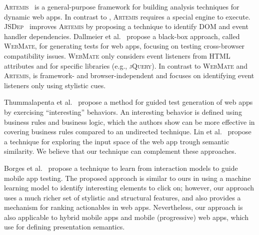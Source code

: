 \textsc{Artemis}~\cite{artzi2011framework} is a general-purpose
framework for building analysis techniques for dynamic \js web apps.
In contrast to \toolName, \textsc{Artemis} 
requires a special \js engine to execute.
\textsc{JSDep}~\cite{Sung:2016:StaticDomDependencyAnalysis}
improves \textsc{Artemis}
by proposing a technique to identify DOM and event handler dependencies.
Dallmeier et al.~\cite{dallmeier2014webmate, Dallmeier:2013:WebMate} propose a black-box
approach, called \textsc{WebMate}, 
for generating tests for web apps, focusing
on testing cross-browser compatibility issues.
\textsc{WebMate} only considers \js event listeners 
from HTML attributes and for specific libraries (e.g., \textsc{jQuery}).
In contrast to \textsc{WebMate} and \textsc{Artemis}, \toolName is framework- and browser-independent
and focuses on identifying event listeners only using stylistic cues.

Thummalapenta et al.~\cite{sinha:icse2013} propose a method
for guided test generation of web apps
by exercising ``interesting''
behaviors.
An interesting behavior is defined using business rules
and business logic,
which the authors show can be more effective
in covering business rules compared to an undirected technique.
Lin et al.~\cite{Lin:2017:Similarity} propose a technique for exploring the input space
of the web app trough semantic similarity.
We believe that our technique can complement these approaches.

Borges et al.~\cite{Borges:2018:GuidingAppTestingMinedInteractionModels}
propose a technique to learn from interaction models 
to guide mobile app testing.
The proposed approach is similar to ours
in using a machine learning model
to identify interesting elements to click on; 
however, our approach uses a much richer set of stylistic and structural features, 
and also provides a mechanism for
ranking actionables 
in web apps.
Nevertheless,
our approach is also applicable to hybrid mobile apps and 
 mobile (progressive) web apps, which use \css for defining presentation semantics.
